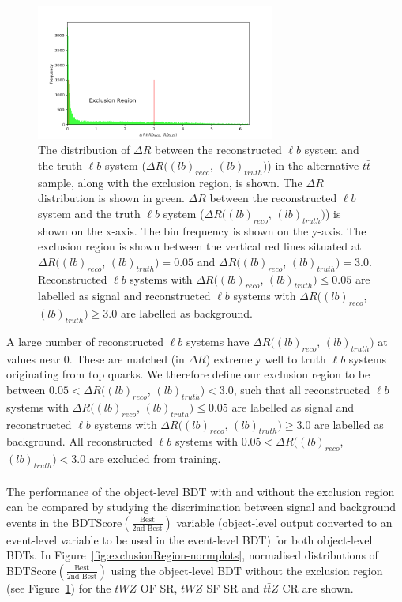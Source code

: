 \begin{figure}
    \centering
    \includegraphics[width=0.7\textwidth]{figures/DeltaR_lb_bdt.png}
    \caption{The distribution of $\Delta R$ between the reconstructed $\ell b$ system and the truth $\ell b$ system ($\Delta R((lb)_{reco}$, $(lb)_{truth})$) in the alternative $t\bar{t}$ sample, along with the exclusion region, is shown. The $\Delta R$ distribution is shown in green. $\Delta R$ between the reconstructed $\ell b$ system and the truth $\ell b$ system ($\Delta R((lb)_{reco}$, $(lb)_{truth})$) is shown on the x-axis. The bin frequency is shown on the y-axis. The exclusion region is shown between the vertical red lines situated at $\Delta R((lb)_{reco}$, $(lb)_{truth}) = 0.05$ and $\Delta R((lb)_{reco}$, $(lb)_{truth})=3.0$. Reconstructed $\ell b$ systems with $\Delta R((lb)_{reco}$, $(lb)_{truth}) \leq 0.05$ are labelled as signal and reconstructed $\ell b$ systems with $\Delta R((lb)_{reco}$, $(lb)_{truth}) \geq 3.0$ are labelled as background. }
    \label{fig:exclusionRegion}
\end{figure}

A large number of reconstructed $\ell b$ systems have $\Delta R((lb)_{reco}$, $(lb)_{truth})$ at values near $0$. These are matched (in $\Delta R$) extremely well to truth $\ell b$ systems originating from top quarks. We therefore define our exclusion region to be between $0.05 < \Delta R((lb)_{reco}$, $(lb)_{truth}) < 3.0$, such that all reconstructed $\ell b$ systems with $\Delta R((lb)_{reco}$, $(lb)_{truth}) \leq 0.05$ are labelled as signal and reconstructed $\ell b$ systems with $\Delta R((lb)_{reco}$, $(lb)_{truth}) \geq 3.0$ are labelled as background. All reconstructed $\ell b$ systems with $0.05 < \Delta R((lb)_{reco}$, $(lb)_{truth}) < 3.0$ are excluded from training.\\\\

The performance of the object-level BDT with and without the exclusion region can be compared by studying the discrimination between signal and background events in the BDTScore$(\frac{\text{Best}}{\text{2nd Best}})$ variable (object-level output converted to an event-level variable to be used in the event-level BDT) for both object-level BDTs. In Figure~\ref{fig:exclusionRegion-normplots}, normalised distributions of BDTScore$(\frac{\text{Best}}{\text{2nd Best}})$ using the object-level BDT without the exclusion region (see Figure~\ref{fig:exclusionRegion}) for the $tWZ$ OF SR, $tWZ$ SF SR and $t\bar{t}Z$ CR are shown.


